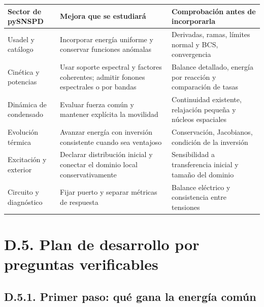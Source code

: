 \documentclass[
  spanish,
  10pt,
  a4paper,
]{article}
\newcounter{none} %
\begin{document}
{\def\LTcaptype{none} %
\begin{longtable}[]{@{}
  >{\raggedright\arraybackslash}p{}
  >{\raggedright\arraybackslash}p{}
  >{\raggedright\arraybackslash}p{}@{}}
\toprule\noalign{}
\begin{minipage}[b]{\linewidth}\raggedright
Sector de pySNSPD
\end{minipage} & \begin{minipage}[b]{\linewidth}\raggedright
Mejora que se estudiará
\end{minipage} & \begin{minipage}[b]{\linewidth}\raggedright
Comprobación antes de incorporarla
\end{minipage} \\
\midrule\noalign{}
\endhead
\bottomrule\noalign{}
\endlastfoot
Usadel y catálogo & Incorporar energía uniforme y conservar funciones
anómalas & Derivadas, ramas, límites normal y BCS, convergencia \\
Cinética y potencias & Usar soporte espectral y factores coherentes;
admitir fonones espectrales o por bandas & Balance detallado, energía
por reacción y comparación de tasas \\
Dinámica de condensado & Evaluar fuerza común y mantener explícita la
movilidad & Continuidad existente, relajación pequeña y núcleos
espaciales \\
Evolución térmica & Avanzar energía con inversión consistente cuando sea
ventajoso & Conservación, Jacobianos, condición de la inversión \\
Excitación y exterior & Declarar distribución inicial y conectar el
dominio local conservativamente & Sensibilidad a transferencia inicial y
tamaño del dominio \\
Circuito y diagnóstico & Fijar puerto y separar métricas de respuesta &
Balance eléctrico y consistencia entre tensiones \\
\end{longtable}
}

\section{D.5. Plan de desarrollo por preguntas
verificables}\label{d.5.-plan-de-desarrollo-por-preguntas-verificables}

\subsection{D.5.1. Primer paso: qué gana la energía
común}\label{d.5.1.-primer-paso-quuxe9-gana-la-energuxeda-comuxfan}
\end{document}
